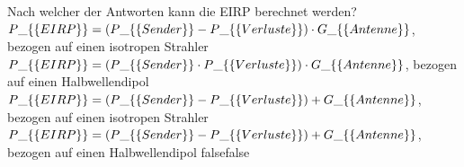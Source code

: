     {Nach welcher der Antworten kann die EIRP berechnet werden?}
    {$P\_\{\textrm\{EIRP\}\} = (P\_\{\textrm\{Sender\}\} - P\_\{\textrm\{Verluste\}\}) \cdot G\_\{\textrm\{Antenne\}\}$, bezogen auf einen isotropen Strahler}
    {$P\_\{\textrm\{EIRP\}\} = (P\_\{\textrm\{Sender\}\} \cdot P\_\{\textrm\{Verluste\}\}) \cdot G\_\{\textrm\{Antenne\}\}$, bezogen auf einen Halbwellendipol}
    {$P\_\{\textrm\{EIRP\}\} = (P\_\{\textrm\{Sender\}\} - P\_\{\textrm\{Verluste\}\}) + G\_\{\textrm\{Antenne\}\}$, bezogen auf einen isotropen Strahler}
    {$P\_\{\textrm\{EIRP\}\} = (P\_\{\textrm\{Sender\}\} - P\_\{\textrm\{Verluste\}\}) + G\_\{\textrm\{Antenne\}\}$, bezogen auf einen Halbwellendipol}
    {false}{false}